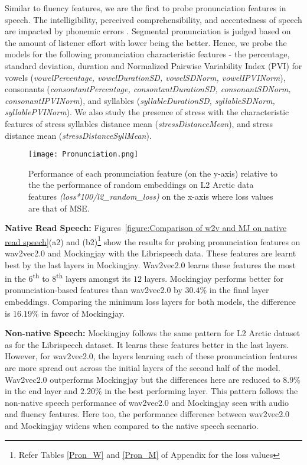 \documentclass[sigconf]{acmart}
\newcommand{\wv}{wav2vec2.0\xspace}
\newcommand{\mj}{Mockingjay\xspace}
\begin{document}
Similar to fluency features, we are the first to probe pronunciation features in speech. The intelligibility, perceived comprehensibility, and accentedness of speech are impacted by phonemic errors \cite{derwing1997accent}. Segmental pronunciation is judged based on the amount of listener effort with lower being the better. Hence, we probe the models for the following pronunciation characteristic features - the percentage, standard deviation, duration and Normalized Pairwise Variability Index (PVI) for vowels (\emph{vowelPercentage, vowelDurationSD, vowelSDNorm, vowelIPVINorm}), consonants (\emph{consontantPercentage, consontantDurationSD, consonantSDNorm, consonantIPVINorm}), and syllables (\emph{syllableDurationSD, syllableSDNorm, syllablePVINorm}). We also study the presence of stress with the characteristic features of stress syllables distance mean (\emph{stressDistanceMean}), and stress distance mean (\emph{stressDistanceSyllMean}).
 
\begin{figure*}
  \texttt{[image: Pronunciation.png]}
  \caption{\label{Pronunciation}Performance of each pronunciation feature (on the y-axis) relative to the the performance of random embeddings on L2 Arctic data features \emph{(loss*100/l2\_random\_loss)} on the x-axis where loss values are that of MSE.}
\end{figure*}

\textbf{Native Read Speech:} Figures~\ref{figure:Comparison of w2v and MJ on native read speech}(a2) and (b2)\footnote{Refer Tables \ref{Pron_W} and \ref{Pron_M} of Appendix for the loss values} show the results for probing pronunciation features on wav2vec2.0 and Mockingjay with the Librispeech data. These features are learnt best by the last layers in Mockingjay. Wav2vec2.0 learns these features the most in the 6\textsuperscript{th} to 8\textsuperscript{th} layers amongst its $12$ layers. Mockingjay performs better for pronunciation-based features than wav2vec2.0 by $30.4\%$ in the final layer embeddings. Comparing the minimum loss layers for both models, the difference is $16.19\%$ in favor of Mockingjay. %

\textbf{Non-native Speech:}
Mockingjay follows the same pattern for L2 Arctic dataset as for 
the Librispeech dataset. It learns these features better in the last layers. However, for wav2vec2.0, the layers learning each of these pronunciation features are more spread out across the initial layers of the second half of the model. Wav2vec2.0 outperforms Mockingjay but the differences here are reduced to $8.9\%$ in the end layer and $2.20\%$ in the best performing layer. This pattern follows the non-native speech performance of {\wv} and {\mj} seen with audio and fluency features. Here too, the performance difference between {\wv} and {\mj} widens when compared to the native speech scenario.
\end{document}
